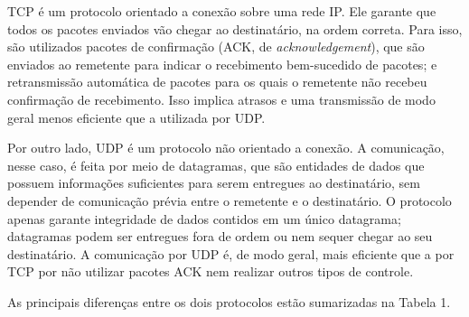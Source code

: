 \documentclass[a4paper,10pt]{article}
\begin{document}
TCP é um protocolo orientado a conexão sobre uma rede IP. Ele garante que todos os pacotes enviados vão chegar ao destinatário, na ordem correta. Para isso, são utilizados pacotes de confirmação (ACK, de \textit{acknowledgement}), que são enviados ao remetente para indicar o recebimento bem-sucedido de pacotes; e retransmissão automática de pacotes para os quais o remetente não recebeu confirmação de recebimento. Isso implica atrasos e uma transmissão de modo geral menos eficiente que a utilizada por UDP.

Por outro lado, UDP é um protocolo não orientado a conexão. A comunicação, nesse caso, é feita por meio de datagramas, que são entidades de dados que possuem informações suficientes para serem entregues ao destinatário, sem depender de comunicação prévia entre o remetente e o destinatário. O protocolo apenas garante integridade de dados contidos em um único datagrama; datagramas podem ser entregues fora de ordem ou nem sequer chegar ao seu destinatário. A comunicação por UDP é, de modo geral, mais eficiente que a por TCP por não utilizar pacotes ACK nem realizar outros tipos de controle.

As principais diferenças entre os dois protocolos estão sumarizadas na Tabela 1.
\end{document}
